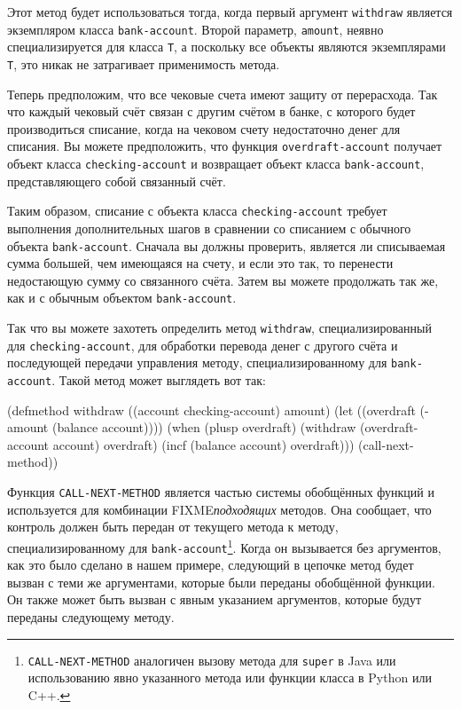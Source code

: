 Этот метод будет использоваться тогда, когда первый аргумент \lstinline{withdraw} является
экземпляром класса \lstinline{bank-account}.  Второй параметр, \lstinline{amount}, неявно
специализируется для класса \lstinline{T}, а поскольку все объекты являются экземплярами
\lstinline{T}, это никак не затрагивает применимость метода.

Теперь предположим, что все чековые счета имеют защиту от перерасхода.  Так что каждый
чековый счёт связан с другим счётом в банке, с которого будет производиться списание,
когда на чековом счету недостаточно денег для списания.  Вы можете предположить, что
функция \lstinline{overdraft-account} получает объект класса \lstinline{checking-account} и
возвращает объект класса \lstinline{bank-account}, представляющего собой связанный счёт.

Таким образом, списание с объекта класса \lstinline{checking-account} требует выполнения
дополнительных шагов в сравнении со списанием с обычного объекта \lstinline{bank-account}.
Сначала вы должны проверить, является ли списываемая сумма большей, чем имеющаяся на
счету, и если это так, то перенести недостающую сумму со связанного счёта.  Затем вы
можете продолжать так же, как и с обычным объектом \lstinline{bank-account}.

Так что вы можете захотеть определить метод \lstinline{withdraw}, специализированный для
\lstinline{checking-account}, для обработки перевода денег с другого счёта и последующей
передачи управления методу, специализированному для \lstinline{bank-account}.  Такой метод
может выглядеть вот так:

\begin{myverb}
(defmethod withdraw ((account checking-account) amount)
  (let ((overdraft (- amount (balance account))))
    (when (plusp overdraft)
      (withdraw (overdraft-account account) overdraft)
      (incf (balance account) overdraft)))
  (call-next-method))
\end{myverb}

Функция \lstinline{CALL-NEXT-METHOD} является частью системы обобщённых функций и используется
для комбинации FIXME\textit{подходящих} методов.  Она сообщает, что контроль должен быть
передан от текущего метода к методу, специализированному для
\lstinline{bank-account}\footnote{\lstinline{CALL-NEXT-METHOD} аналогичен вызову метода для
  \lstinline{super} в Java или использованию явно указанного метода или функции класса в Python
  или C++.}.  Когда он вызывается без аргументов, как это было сделано в нашем примере,
следующий в цепочке метод будет вызван с теми же аргументами, которые были переданы
обобщённой функции.  Он также может быть вызван с явным указанием аргументов, которые
будут переданы следующему методу.

